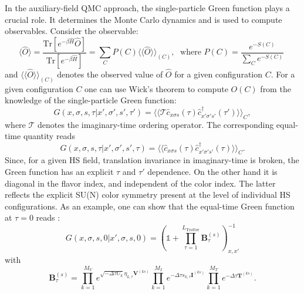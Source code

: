 In the auxiliary-field QMC approach, the single-particle Green function plays a crucial role.  It determines the Monte Carlo dynamics and is used to compute  observables. Consider the observable:
\begin{equation}\label{eqn:obs}
\langle \hat{O}  \rangle  = \frac{ \text{Tr}   \left[ e^{- \beta \hat{H}}  \hat{O}  \right] }{ \text{Tr}   \left[ e^{- \beta \hat{H}}  \right] } =   \sum_{C}   P(C) 
   \langle \langle \hat{O}  \rangle \rangle_{(C)} ,
   \; \text{ where } 
  P(C)   = \frac{ e^{-S(C)}}{\sum_C e^{-S(C)}}\;
\end{equation}
and $\langle \langle \hat{O}  \rangle \rangle_{(C)} $ denotes the observed value of $\hat{O}$ for a given configuration $C$.
For a given configuration $C$  one can use Wick's theorem to compute $O (C) $   from the knowledge of the single-particle Green function: 
\begin{equation}
       G( x,\sigma,s, \tau |    x',\sigma',s', \tau')   =       \langle \langle \mathcal{T} \hat{c}^{\phantom\dagger}_{x \sigma s} (\tau)  \hat{c}^{\dagger}_{x' \sigma' s'} (\tau') \rangle \rangle_{C},
\end{equation}
where $ \mathcal{T} $ denotes the imaginary-time ordering operator.   The  corresponding equal-time quantity reads
\begin{equation}
       G( x,\sigma,s, \tau |    x',\sigma',s', \tau)   =       \langle \langle  \hat{c}^{\phantom\dagger}_{x \sigma s} (\tau)  \hat{c}^{\dagger}_{x' \sigma' s'} (\tau) \rangle \rangle_{C}.
\end{equation}
Since, for a given HS field, translation invariance in imaginary-time is broken, the Green function has an explicit $\tau$ and $\tau'$ dependence.   On the other hand it is diagonal in the flavor index, and independent of the color index. The latter reflects the  explicit SU(N) color symmetry present at the level of individual HS configurations.   As an example,  one can show that the equal-time Green function at $\tau = 0$ reads \cite{Assaad08_rev}:
\begin{equation}\label{eqn:Green_eq}
G(x,\sigma,s,0| x',\sigma,s,0 )  =   \left(  \mathds{1}  +  \prod_{\tau = 1}^{L_{\text{Trotter}}}  \bm{B}_{\tau}^{(s)}   \right)^{-1}_{x,x'}
\end{equation}
with
\begin{equation}
\label{Btau.eq}
	\bm{B}_{\tau}^{(s)} =   
    \prod_{k=1}^{M_V}   e^{  \sqrt{ -\Delta \tau  U_k} \eta_{k,\tau} {\bm V}^{(ks)} }   \prod_{k=1}^{M_I}   e^{  -\Delta \tau s_{k,\tau}  {\bm I}^{(ks)}}
    \prod_{k=1}^{M_T}   e^{-\Delta \tau {\bm T}^{(ks)}} .
\end{equation}


